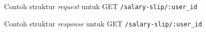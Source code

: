 \begin{figure}
    \centering
    \caption{Contoh struktur \textit{request} untuk GET \texttt{/salary-slip/{:user\_id}}}
    \label{fig:request_salary_slip_by_id_get}
\end{figure}
\begin{figure}
    \centering
    \caption{Contoh struktur \textit{response} untuk GET \texttt{/salary-slip/{:user\_id}}}
    \label{fig:response_salary_slip_by_id_get}
\end{figure}

